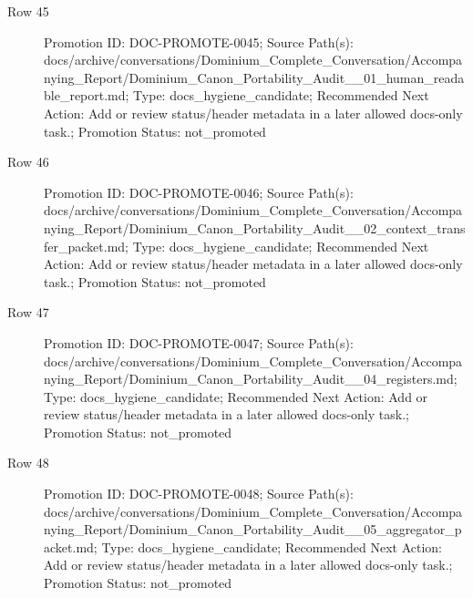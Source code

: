 \documentclass[10.5pt,a4paper,openany]{book}
\begin{document}
\begin{description}
\item[Row 45] Promotion ID: DOC-\allowbreak{}PROMOTE-\allowbreak{}0045; Source Path(s): docs/\allowbreak{}archive/\allowbreak{}conversations/\allowbreak{}Dominium\_\allowbreak{}Complete\_\allowbreak{}Conversation/\allowbreak{}Accompanying\_\allowbreak{}Report/\allowbreak{}Dominium\_\allowbreak{}Canon\_\allowbreak{}Portability\_\allowbreak{}Audit\_\allowbreak{}\_\allowbreak{}01\_\allowbreak{}human\_\allowbreak{}readable\_\allowbreak{}report.\allowbreak{}md; Type: docs\_\allowbreak{}hygiene\_\allowbreak{}candidate; Recommended Next Action: Add or review status/\allowbreak{}header metadata in a later allowed docs-\allowbreak{}only task.\allowbreak{}; Promotion Status: not\_\allowbreak{}promoted
\item[Row 46] Promotion ID: DOC-\allowbreak{}PROMOTE-\allowbreak{}0046; Source Path(s): docs/\allowbreak{}archive/\allowbreak{}conversations/\allowbreak{}Dominium\_\allowbreak{}Complete\_\allowbreak{}Conversation/\allowbreak{}Accompanying\_\allowbreak{}Report/\allowbreak{}Dominium\_\allowbreak{}Canon\_\allowbreak{}Portability\_\allowbreak{}Audit\_\allowbreak{}\_\allowbreak{}02\_\allowbreak{}context\_\allowbreak{}transfer\_\allowbreak{}packet.\allowbreak{}md; Type: docs\_\allowbreak{}hygiene\_\allowbreak{}candidate; Recommended Next Action: Add or review status/\allowbreak{}header metadata in a later allowed docs-\allowbreak{}only task.\allowbreak{}; Promotion Status: not\_\allowbreak{}promoted
\item[Row 47] Promotion ID: DOC-\allowbreak{}PROMOTE-\allowbreak{}0047; Source Path(s): docs/\allowbreak{}archive/\allowbreak{}conversations/\allowbreak{}Dominium\_\allowbreak{}Complete\_\allowbreak{}Conversation/\allowbreak{}Accompanying\_\allowbreak{}Report/\allowbreak{}Dominium\_\allowbreak{}Canon\_\allowbreak{}Portability\_\allowbreak{}Audit\_\allowbreak{}\_\allowbreak{}04\_\allowbreak{}registers.\allowbreak{}md; Type: docs\_\allowbreak{}hygiene\_\allowbreak{}candidate; Recommended Next Action: Add or review status/\allowbreak{}header metadata in a later allowed docs-\allowbreak{}only task.\allowbreak{}; Promotion Status: not\_\allowbreak{}promoted
\item[Row 48] Promotion ID: DOC-\allowbreak{}PROMOTE-\allowbreak{}0048; Source Path(s): docs/\allowbreak{}archive/\allowbreak{}conversations/\allowbreak{}Dominium\_\allowbreak{}Complete\_\allowbreak{}Conversation/\allowbreak{}Accompanying\_\allowbreak{}Report/\allowbreak{}Dominium\_\allowbreak{}Canon\_\allowbreak{}Portability\_\allowbreak{}Audit\_\allowbreak{}\_\allowbreak{}05\_\allowbreak{}aggregator\_\allowbreak{}packet.\allowbreak{}md; Type: docs\_\allowbreak{}hygiene\_\allowbreak{}candidate; Recommended Next Action: Add or review status/\allowbreak{}header metadata in a later allowed docs-\allowbreak{}only task.\allowbreak{}; Promotion Status: not\_\allowbreak{}promoted

\end{description}
\end{document}
